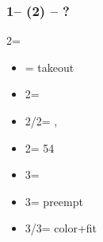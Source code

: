 \documentclass[12pt, a4paper]{article}
\begin{document}
\subsubsection*{1\diams -- (2\clubs) -- ?}
2\nt = \minor
\begin{itemize}
    \item \dbl = takeout
    \item 2\diams = \nat
    \item 2\hearts/2\spades = \nat, \fonce
    \item 2\nt = 54\major
    \item 3\clubs = \diams\ \invp
    \item 3\diams = preempt
    \item 3\hearts/3\spades = color+fit
\end{itemize}

\end{document}
